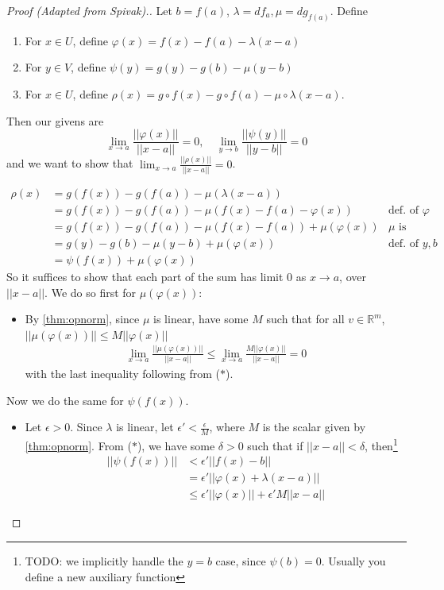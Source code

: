 \begin{proof}[Proof (Adapted from Spivak).]
    Let $b = f(a)$, $\lambda = df_a, \mu = dg_{f(a)}$. Define
    \begin{enumerate}
        \item For $x \in U$, define $\varphi(x) = f(x) - f(a) - \lambda(x - a)$
        \item For $y \in V$, define $\psi(y) = g(y) - g(b) - \mu(y - b)$
        \item For $x \in U$, define $\rho(x) = g \circ f(x) - g \circ f(a) - \mu \circ \lambda (x - a)$.
    \end{enumerate}
        \noindent Then our givens are
        \[
        \lim_{ x \to a } \frac{||\varphi(x)||}{||x-a||} = 0 \tag{$*$}, \quad\lim_{ y \to b } \frac{||\psi(y)||}{||y - b||} = 0
        \]
        and we want to show that $\displaystyle \lim_{ x \to a } \frac{||\rho(x)||}{||x-a||} = 0$.

    \begin{align*}
        \rho(x) &= g(f(x)) - g(f(a)) - \mu(\lambda(x-a)) & \\
        &= g(f(x)) - g(f(a)) - \mu(f(x) - f(a) - \varphi(x)) & \text{def. of $\varphi$}\\
        &= g(f(x)) - g(f(a)) - \mu(f(x) - f(a)) + \mu(\varphi(x)) & \text{$\mu$ is linear} \\
        &= g(y) - g(b) - \mu(y - b) + \mu(\varphi(x)) & \text{def. of $y, b$} \\
        &= \psi(f(x)) + \mu(\varphi(x))
    \end{align*}
    So it suffices to show that each part of the sum has limit 0 as $x \to a$, over $||x - a||$. We do so first for $\mu(\varphi(x))$:
    \begin{itemize}
        \item[] By \ref{thm:opnorm}, since $\mu$ is linear, have some $M$ such that for all $v \in \mathbb{R}^m$, $||\mu(\varphi(x))|| \leq M||\varphi(x)||$
        \begin{align*}
        \lim_{ x \to a } \frac{||\mu(\varphi(x))||}{||x-a||} \leq \lim_{ x \to a } \frac{M||\varphi(x)||}{||x-a||} = 0
    \end{align*}
        with the last inequality following from ($*$).
    \end{itemize}
    Now we do the same for $\psi(f(x))$.
    \begin{itemize}
        \item[] Let $\epsilon > 0$. Since $\lambda$ is linear, let $\epsilon' < \frac{\epsilon}{M}$, where $M$ is the scalar given by \ref{thm:opnorm}. From ($*$), we have some $\delta > 0$ such that if $||x - a|| < \delta$, then\footnote{TODO: we implicitly handle the $y = b$ case, since $\psi(b) = 0$. Usually you define a new auxiliary function}
        \begin{align*}
            ||\psi(f(x))|| &< \epsilon' ||f(x) - b||  \\
            &= \epsilon' ||\varphi(x) + \lambda(x-a)|| \\
            &\leq \epsilon' ||\varphi(x)|| + \epsilon' M||x-a||
        \end{align*}


\end{itemize}
\end{proof}
